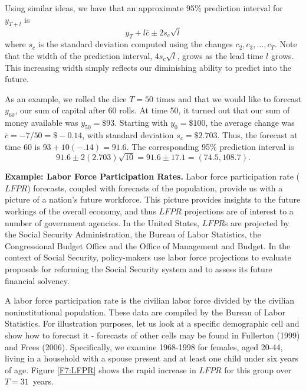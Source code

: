 Using similar ideas, we have that an approximate 95\% prediction interval
for $y_{T+l}$ is%
\begin{equation*}
y_T+l\overline{c}\pm 2s_c\sqrt{l}
\end{equation*}
where $s_c$ is the standard deviation computed using the changes
$c_2,c_{3},\ldots,c_T$. Note that the width of the prediction
interval, $4 s_c \sqrt{l}$, grows as the lead time $l$ grows. This
increasing width simply reflects our diminishing ability to predict
into the future.

As an example, we rolled the dice $T=50$ times and that we would
like to forecast $y_{60}$, our sum of capital after 60 rolls. At
time 50, it turned out that our sum of money available was
$y_{50}=\$93$. Starting with $y_0 = \$100$, the average change was
$\overline{c} = -7/50 = \$-0.14$, with standard deviation
$s_c=\$2.703$. Thus, the forecast at time 60 is $93+10(-.14) =
91.6$. The corresponding 95\% prediction interval
is%
\begin{equation*}
91.6\pm 2\left( 2.703\right) \sqrt{10}=91.6\pm 17.1=\left( 74.5,108.7\right)
.
\end{equation*}

\linejed


\textbf{Example: Labor Force Participation Rates.} Labor force participation rate ($LFPR$)
forecasts, coupled with forecasts of the population, provide us with
a picture of a nation's future workforce. This picture provides
insights to the future workings of the overall economy, and thus
$LFPR$ projections are of interest to a number of government
agencies. In the United States, $LFPR$s are projected by the Social
Security Administration, the Bureau of Labor Statistics, the
Congressional Budget Office and the Office of Management and Budget.
In the context of Social Security, policy-makers use labor force
projections to evaluate proposals for reforming the Social Security
system and to assess its future financial solvency.

A labor force participation rate is the civilian labor force divided
by the civilian noninstitutional population. These data are compiled
by the Bureau of Labor Statistics. For illustration purposes, let us
look at a specific demographic cell and show how to forecast it -
forecasts of other cells may be found in Fullerton (1999) and Frees
(2006). Specifically, we examine 1968-1998 for females, aged 20-44,
living in a household with a spouse present and at least one child
under six years of age. Figure \ref{F7:LFPR} shows the rapid
increase in $LFPR$ for this group over $T=31$\ years.


